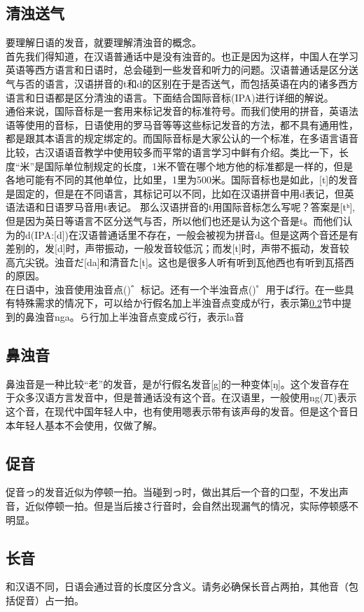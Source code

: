 \documentclass[12pt, a4paper, oneside]{book}
\newcommand{\jp}{\CJKfamily{zj}}
\begin{document}
\subsection{清浊送气}
要理解日语的发音，就要理解清浊音的概念。\\首先我们得知道，在汉语普通话中是没有浊音的。也正是因为这样，中国人在学习英语等西方语言和日语时，总会碰到一些发音和听力的问题。汉语普通话是区分送气与否的语言，汉语拼音的t和d的区别在于是否送气，而包括英语在内的诸多西方语言和日语都是区分清浊的语言。下面结合国际音标(IPA)进行详细的解说。
\\通俗来说，国际音标是一套用来标记发音的标准符号。而我们使用的拼音，英语法语等使用的音标，日语使用的罗马音等等这些标记发音的方法，都不具有通用性，都是跟其本语言的规定绑定的。而国际音标是大家公认的一个标准，在多语言语音比较，古汉语语音教学中使用较多而平常的语言学习中鲜有介绍。类比一下，长度“米”是国际单位制规定的长度，1米不管在哪个地方他的标准都是一样的，但是各地可能有不同的其他单位，比如里，1里为500米。国际音标也是如此，[t]的发音是固定的，但是在不同语言，其标记可以不同，比如在汉语拼音中用d表记，但英语法语和日语罗马音用t表记。
那么汉语拼音的t用国际音标怎么写呢？答案是[tʰ],但是因为英日等语言不区分送气与否，所以他们也还是认为这个音是t。而他们认为的d(IPA:[d])在汉语普通话里不存在，一般会被视为拼音d。但是这两个音还是有差别的，发[d]时，声带振动，一般发音较低沉；而发[t]时，声带不振动，发音较高亢尖锐。浊音だ[da]和清音た[t]。这也是很多人听{\jp {}}有听到瓦他西也有听到瓦搭西的原因。\\
在日语中，浊音使用浊音点({\jp {}})゛标记。还有一个半浊音点({\jp {}})゜用于ぱ行。在一些具有特殊需求的情况下，可以给か行假名加上半浊音点变成か゚行，表示第\ref{sct:bdo}节中提到的鼻浊音nga。ら行加上半浊音点变成ら゚行，表示la音
\subsection{鼻浊音}\label{sct:bdo}
鼻浊音是一种比较“老”的发音，是が行假名发音[g]的一种变体[ŋ]。这个发音存在于众多汉语方言发音中，但是普通话没有这个音。在汉语里，一般使用ng(ㄫ)表示这个音，在现代中国年轻人中，也有使用嗯表示带有该声母的发音。但是这个音日本年轻人基本不会使用，仅做了解。
\subsection{促音}
促音っ的发音近似为停顿一拍。当碰到っ时，做出其后一个音的口型，不发出声音，近似停顿一拍。但是当后接さ行音时，会自然出现漏气的情况，实际停顿感不明显。
\subsection{长音}
和汉语不同，日语会通过音的长度区分含义。请务必确保长音占两拍，其他音（包括促音）占一拍。
\end{document}

